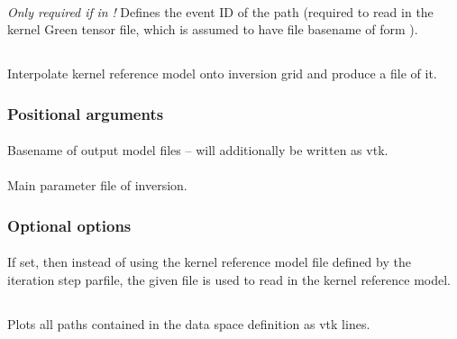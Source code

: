 \paragraph{}
\emph{Only required if}  \emph{in}  \emph{!}
Defines the event ID of the path (required to read in the kernel Green tensor file, which is assumed
to have file basename of form ).
%
%
\subsection{} \label{programs_scripts,sec:bin_prog,sec:krm_kim}
Interpolate kernel reference model onto inversion grid and produce a  file of it.

\subsubsection{Positional arguments}
\paragraph{}
Basename of output model files -- will additionally be written as vtk.
\paragraph{}
Main parameter file of inversion.
\subsubsection{Optional options}
\paragraph{}
If set, then instead of using the kernel reference model file defined by the iteration step parfile, 
the given file  is used to read in the kernel reference model.
%
%
\subsection{} \label{programs_scripts,sec:bin_prog,sec:path_to_vtk}  
Plots all paths contained in the data space definition as vtk lines. 
